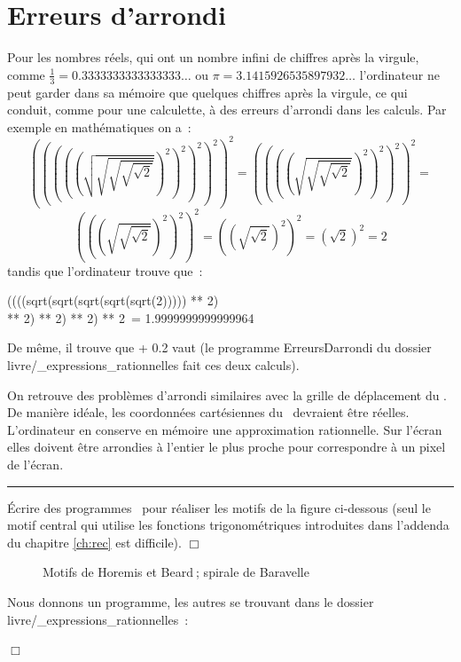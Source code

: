 \section{Erreurs d'arrondi}
Pour les nombres réels, qui ont un nombre infini de chiffres après la virgule, comme
$\frac{1}{3} = 0.3333333333333333\ldots$ ou $\pi = 3.1415926535897932\ldots$
l'ordinateur ne peut garder dans sa mémoire que quelques chiffres après la virgule, ce
qui conduit, comme pour une calculette, à des erreurs d'arrondi dans les calculs. Par
exemple en ma\-thé\-ma\-ti\-ques on a~:
\[\left(\left(\left(\left(\left(\sqrt{\sqrt{\sqrt{\sqrt{\sqrt{2}}}}}\right)^{2}\right)^{2}\right)^{2}\right)^{2}\right)^{2} =
\left(\left(\left(\left(\sqrt{\sqrt{\sqrt{\sqrt{2}}}}\right)^{2}\right)^{2}\right)^{2}\right)^{2} =
\] \[\left(\left(\left(\sqrt{\sqrt{\sqrt{2}}}\right)^{2}\right)^{2}\right)^{2} =
\left(\left(\sqrt{\sqrt{2}}\right)^{2}\right)^{2} =
\left(\sqrt{2}\right)^{2} =
2\]
tandis que l'ordinateur trouve  que~:
\begin{center}
{\idt ((((sqrt(sqrt(sqrt(sqrt(sqrt(2))))) ** 2)\hspace*{6em}}\\
{\idt \hspace*{6em}** 2) ** 2) ** 2) ** 2\ = 1.9999999999999964}
\end{center}

\noindent De même, il trouve que { + 0.2} vaut
{} (le programme {\idt ErreursDarrondi} du dossier
{\idt livre/\_expressions\_rationnelles} fait ces deux calculs).

\noindent  On retrouve des problèmes d'arrondi similaires avec la grille de dé\-pla\-ce\-ment du \robot. De
manière idéale, les coordonnées cartésiennes du \robot\ devraient être réelles.
L'ordinateur en conserve en mémoire une approximation rationnelle. Sur l'écran elles doivent
être arrondies à l'entier le plus proche pour correspondre à un pixel de l'écran.

\noindent \rule{137mm}{0.1mm} %
\begin{exercice}{Écrire des programmes \python\  pour réaliser les motifs de la figure
ci-dessous (seul le motif central qui utilise les fonc\-tions tri\-go\-no\-mé\-tri\-ques in\-tro\-dui\-tes
dans l'addenda du chapitre \ref{ch:rec}  est difficile).
\noindent $\Box$}\end{exercice}
\begin{figure}[htbp]
 \caption{Motifs de Horemis et Beard$\:$; spirale de Baravelle}\label{fig:beard}
\end{figure}
\vfill
\begin{corrige}{
Nous donnons un programme, les autres se trouvant dans le dossier
{\idt livre/\_expressions\_rationnelles}~:
\label{prog:CarresImbriquesPeints}

\noindent $\Box$}\end{corrige}

